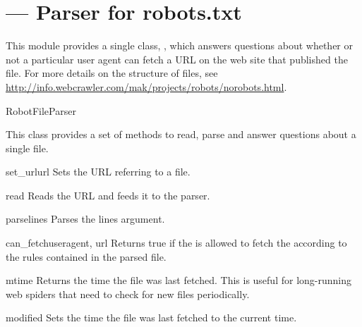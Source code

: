 \section{ --- 
         Parser for robots.txt}



This module provides a single class, , which answers
questions about whether or not a particular user agent can fetch a URL on
the web site that published the  file.  For more details on 
the structure of  files, see
\url{http://info.webcrawler.com/mak/projects/robots/norobots.html}. 

\begin{classdesc}{RobotFileParser}{}

This class provides a set of methods to read, parse and answer questions
about a single  file.

\begin{methoddesc}{set_url}{url}
Sets the URL referring to a  file.
\end{methoddesc}

\begin{methoddesc}{read}{}
Reads the  URL and feeds it to the parser.
\end{methoddesc}

\begin{methoddesc}{parse}{lines}
Parses the lines argument.
\end{methoddesc}

\begin{methoddesc}{can_fetch}{useragent, url}
Returns true if the  is allowed to fetch the 
according to the rules contained in the parsed  file.
\end{methoddesc}

\begin{methoddesc}{mtime}{}
Returns the time the  file was last fetched.  This is
useful for long-running web spiders that need to check for new
 files periodically.
\end{methoddesc}

\begin{methoddesc}{modified}{}
Sets the time the  file was last fetched to the current
time.
\end{methoddesc}

\end{classdesc}

